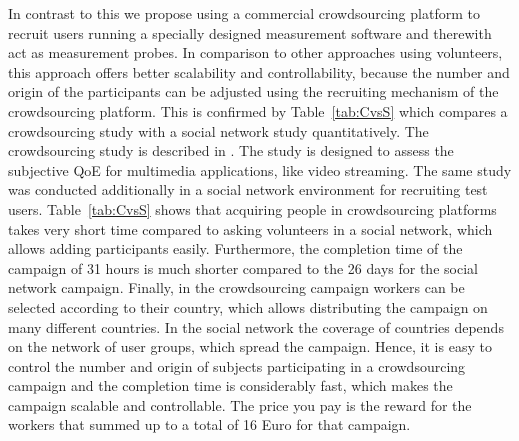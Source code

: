 In contrast to this we propose using a commercial crowdsourcing platform to recruit users running a specially designed measurement software and therewith act as measurement probes.
In comparison to other approaches using volunteers, this approach offers better scalability and controllability, because the number and origin of the participants can be adjusted using the recruiting mechanism of the crowdsourcing platform.
This is confirmed by Table~\ref{tab:CvsS} which compares a crowdsourcing study with a social network study quantitatively. The crowdsourcing study  is described in \cite{bookchapter2013-18}. The study is designed to assess the subjective QoE for multimedia applications, like video streaming.
The same study was conducted additionally in a social network environment for recruiting test users.
Table~\ref{tab:CvsS} shows that acquiring people in crowdsourcing platforms takes very short time compared to asking volunteers in a social network, which allows adding participants easily.
Furthermore, the completion time of the campaign of 31 hours is much shorter compared to the 26 days for the social network campaign.
Finally, in the crowdsourcing campaign workers can be selected according to their country, which allows distributing the campaign on many different countries. In the social network the coverage of countries depends on the network of user groups, which spread the campaign.
Hence, it is easy to control the number and origin of subjects participating in a crowdsourcing campaign and the completion time is considerably fast, which makes the campaign scalable and controllable. The price you pay is the reward for the workers that summed up to a total of 16 Euro for that campaign.

